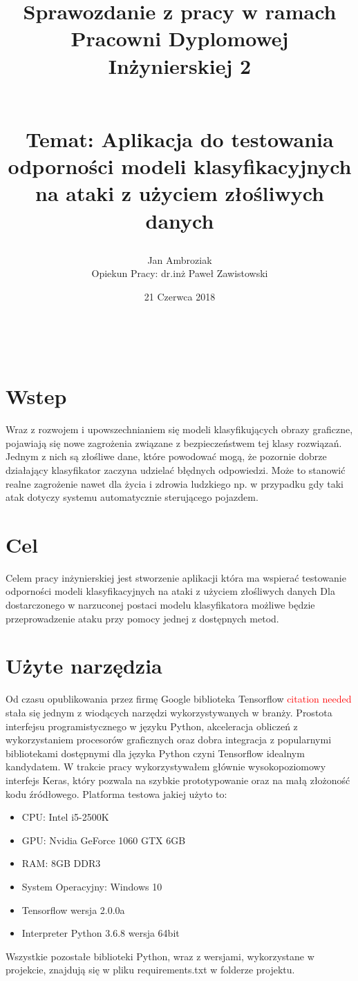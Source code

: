 \documentclass{article}
\title{
Sprawozdanie z pracy w ramach Pracowni Dyplomowej Inżynierskiej 2
\begin{large}
\\Temat: Aplikacja do testowania odporności
modeli klasyfikacyjnych na ataki z użyciem złośliwych danych
\end{large}}
\date{21 Czerwca 2018}
\author{Jan Ambroziak \\ Opiekun Pracy: dr.inż Paweł Zawistowski}
\newcommand\todo[1]{\textcolor{red}{#1}}
\begin{document}
\maketitle

\

\section{Wstep}
Wraz z rozwojem i upowszechnianiem się modeli klasyfikujących obrazy graficzne,
pojawiają się nowe zagrożenia związane z bezpieczeństwem tej klasy rozwiązań.
Jednym z nich są złośliwe dane, które powodować mogą,
że pozornie dobrze działający klasyfikator zaczyna udzielać błędnych odpowiedzi.
Może to stanowić realne zagrożenie nawet dla życia i zdrowia ludzkiego
np. w przypadku gdy taki atak dotyczy systemu automatycznie sterującego pojazdem.

\section{Cel}
\label{sec:target}
Celem pracy inżynierskiej jest stworzenie aplikacji która ma wspierać testowanie
odporności modeli klasyfikacyjnych na ataki z użyciem złośliwych danych
Dla dostarczonego w narzuconej postaci modelu klasyfikatora możliwe będzie
przeprowadzenie ataku przy pomocy jednej z dostępnych metod.

\section{Użyte narzędzia}
Od czasu opublikowania przez firmę Google biblioteka Tensorflow \todo{citation needed}
stała się jednym z wiodących narzędzi wykorzystywanych w branży. Prostota interfejsu programistycznego
w języku Python, akceleracja obliczeń z wykorzystaniem procesorów graficznych oraz dobra integracja z
popularnymi bibliotekami dostępnymi dla języka Python czyni Tensorflow idealnym kandydatem.
W trakcie pracy wykorzystywałem głównie wysokopoziomowy interfejs Keras, który pozwala na szybkie
prototypowanie oraz na małą złożoność kodu źródłowego.
Platforma testowa jakiej użyto to:
\begin{itemize}
    \item CPU: Intel i5-2500K
    \item GPU: Nvidia GeForce 1060 GTX 6GB
    \item RAM: 8GB DDR3
    \item System Operacyjny: Windows 10
    \item Tensorflow wersja 2.0.0a
    \item Interpreter Python 3.6.8 wersja 64bit
\end{itemize}
Wszystkie pozostałe biblioteki Python, wraz z wersjami, wykorzystane w projekcie, znajdują się w pliku
requirements.txt w folderze projektu.
\end{document}
